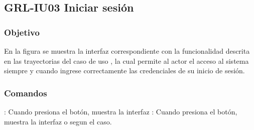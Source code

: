 \clearpage
\subsection{GRL-IU03 Iniciar sesión}

\subsubsection{Objetivo}
En la figura  se muestra la interfaz correspondiente con la funcionalidad descrita en las
trayectorias del caso de uso  , la cual permite al actor el acceso al sistema
siempre y cuando ingrese correctamente las credenciales de su inicio de sesión.

\subsubsection{Comandos}


\Titem {} : Cuando presiona el botón, muestra la interfaz %
\Titem {} : Cuando presiona el botón, muestra la interfaz  o  segun el caso.



\clearpage
